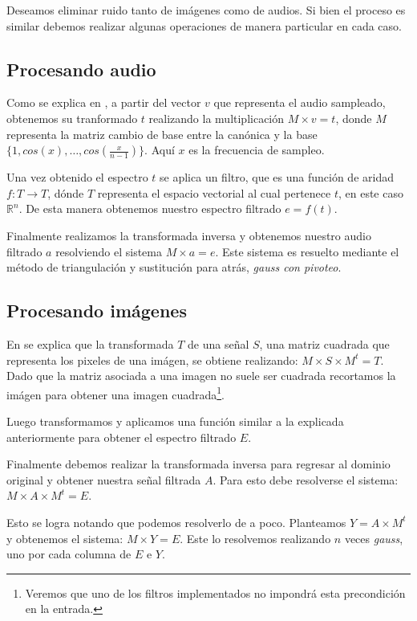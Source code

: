 \PARstart Deseamos eliminar ruido tanto de im\'agenes como de
audios. Si bien el proceso es similar debemos realizar algunas
operaciones de manera particular en cada caso.

\subsection{Procesando audio}

Como se explica en \cite{enunciado}, a partir del vector $v$ que
representa el audio sampleado, obtenemos su tranformado $t$ realizando
la multiplicaci\'on $M \times v = t$, donde $M$ representa la
matriz cambio de base entre la can\'onica y la base
$\{1, cos(x), \ldots, cos(\frac{x}{n-1})\}$. Aqu\'i $x$ es la frecuencia
de sampleo.

Una vez obtenido el espectro $t$ se aplica un filtro, que es una funci\'on
de aridad $f : T \rightarrow T$, d\'onde $T$ representa el espacio
vectorial al cual pertenece $t$, en este caso $\mathbb{R}^n$.
De esta manera obtenemos nuestro espectro filtrado $e = f(t)$.

Finalmente realizamos la transformada inversa y obtenemos nuestro
audio filtrado $a$ resolviendo el sistema
$ M \times a = e $.
Este sistema es resuelto mediante el m\'etodo de triangulaci\'on
y sustituci\'on para atr\'as, {\em gauss con pivoteo}.

\subsection{Procesando im\'agenes}

En \cite{enunciado} se explica que la transformada $T$ de una se\~nal
$S$, una matriz cuadrada que representa los pixeles de una
im\'agen, se obtiene realizando: $ M \times S \times M^{t} = T $.
Dado que la matriz asociada a una imagen no suele ser cuadrada
recortamos la im\'agen para obtener una imagen cuadrada\footnote{
Veremos que uno de los filtros implementados no impondr\'a esta
precondici\'on en la entrada.}.

Luego transformamos y aplicamos una funci\'on similar a la
explicada anteriormente
para obtener el espectro filtrado $E$.

Finalmente debemos realizar la transformada inversa para regresar
al dominio original y obtener nuestra se\~nal filtrada $A$.
Para esto debe resolverse el sistema: $ M \times A \times M^{t} = E $.

Esto se logra notando que podemos resolverlo de a poco. Planteamos
$ Y = A \times M^{t} $ y obtenemos el sistema: $ M \times Y = E $.
Este lo resolvemos realizando $n$ veces {\em gauss}, uno por cada
columna de $E$ e $Y$.

